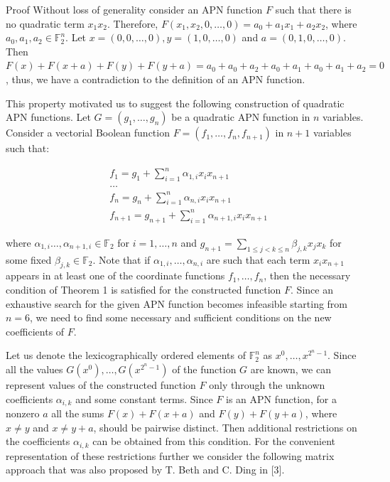 \documentclass[10pt]{article}
\begin{document}
Proof Without loss of generality consider an APN function $F$ such that there is no quadratic term $x_{1} x_{2}$. Therefore, $F\left(x_{1}, x_{2}, 0, \ldots, 0\right)=a_{0}+a_{1} x_{1}+a_{2} x_{2}$, where\\
$a_{0}, a_{1}, a_{2} \in \mathbb{F}_{2}^{n}$. Let $x=(0,0, \ldots, 0), y=(1,0, \ldots, 0)$ and $a=(0,1,0, \ldots, 0)$. Then $F(x)+F(x+a)+F(y)+F(y+a)=a_{0}+a_{0}+a_{2}+a_{0}+a_{1}+a_{0}+a_{1}+a_{2}=0$, thus, we have a contradiction to the definition of an APN function.

This property motivated us to suggest the following construction of quadratic APN functions. Let $G=\left(g_{1}, \ldots, g_{n}\right)$ be a quadratic APN function in $n$ variables. Consider a vectorial Boolean function $F=\left(f_{1}, \ldots, f_{n}, f_{n+1}\right)$ in $n+1$ variables such that:


\begin{align*}
& f_{1}=g_{1}+\sum_{i=1}^{n} \alpha_{1, i} x_{i} x_{n+1} \\
& \ldots \\
& f_{n}=g_{n}+\sum_{i=1}^{n} \alpha_{n, i} x_{i} x_{n+1}  \tag{1}\\
& f_{n+1}=g_{n+1}+\sum_{i=1}^{n} \alpha_{n+1, i} x_{i} x_{n+1}
\end{align*}


where $\alpha_{1, i} \ldots, \alpha_{n+1, i} \in \mathbb{F}_{2}$ for $i=1, \ldots, n$ and $g_{n+1}=\sum_{1 \leqslant j<k \leqslant n} \beta_{j, k} x_{j} x_{k}$ for some fixed $\beta_{j, k} \in \mathbb{F}_{2}$. Note that if $\alpha_{1, i}, \ldots, \alpha_{n, i}$ are such that each term $x_{i} x_{n+1}$ appears in at least one of the coordinate functions $f_{1}, \ldots, f_{n}$, then the necessary condition of Theorem 1 is satisfied for the constructed function $F$. Since an exhaustive search for the given APN function becomes infeasible starting from $n=6$, we need to find some necessary and sufficient conditions on the new coefficients of $F$.

Let us denote the lexicographically ordered elements of $\mathbb{F}_{2}^{n}$ as $x^{0}, \ldots, x^{2^{n}-1}$. Since all the values $G\left(x^{0}\right), \ldots, G\left(x^{2^{n}-1}\right)$ of the function $G$ are known, we can represent values of the constructed function $F$ only through the unknown coefficients $\alpha_{i, k}$ and some constant terms. Since $F$ is an APN function, for a nonzero $a$ all the sums $F(x)+F(x+a)$ and $F(y)+F(y+a)$, where $x \neq y$ and $x \neq y+a$, should be pairwise distinct. Then additional restrictions on the coefficients $\alpha_{i, k}$ can be obtained from this condition. For the convenient representation of these restrictions further we consider the following matrix approach that was also proposed by T. Beth and C. Ding in [3].
\end{document}
